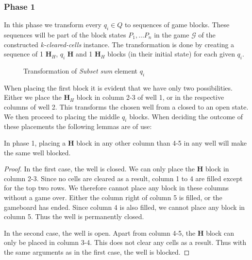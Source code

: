 \subsubsection{Phase 1}
\label{subsub:phaseone}
In this phase we transform every $q_i \in Q$ to sequences of game blocks. These sequences will be part of the block states $P_1, \ldots P_n$ in the game $\mathcal{G}$ of the constructed \textit{k-cleared-cells} instance. The transformation is done by creating a sequence of 1 $\mathbf{H}_{H}$, $q_i$ $\mathbf{H}$ and 1 $\mathbf{H}_H$ blocks (in their initial state) for each given $q_i$.

\begin{figure}[H]
    \centering
    \caption{Transformation of \textit{Subset sum} element $q_i$}
    \label{fig:transforms}
\end{figure}

When placing the first block it is evident that we have only two possibilities. Either we place the $\mathbf{H}_H$ block in column 2-3 of  well 1, or in the respective columns of well 2. This transforms the chosen well from a closed to an open state. We then proceed to placing the middle $q_i$ blocks. When deciding the outcome of these placements the following lemmas are of use:\\

\begin{lem}
\label{lem:permclose}
In phase 1, placing a $\mathbf{H}$ block in any other column than 4-5 in any well will make the same well blocked.
\end{lem}

\begin{proof}
In the first case, the well is closed. We can only place the $\mathbf{H}$ block in column 2-3. Since no cells are cleared as a result, column 1 to 4 are filled except for the top two rows. We therefore cannot place any block in these columns without a game over. Either the column right of column 5 is filled, or the gameboard has ended. Since column 4 is also filled, we cannot place any block in column 5. Thus the well is permanently closed.

In the second case, the well is open. Apart from column 4-5, the $\mathbf{H}$ block can only be placed in column 3-4. This does not clear any cells as a result. Thus with the same arguments as in the first case, the well is blocked.
\end{proof}

